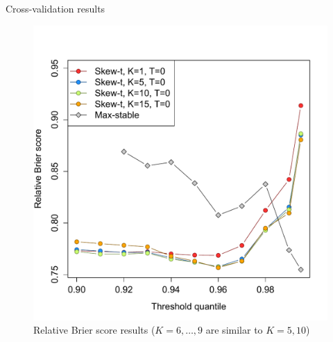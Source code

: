 \documentclass{beamer}
\begin{document}
\begin{frame}{Cross-validation results}
  \centering
  \begin{figure}
    \includegraphics[width=0.6\linewidth, trim=0 0 0 1in]{./plots/pot/bs-ozone-1.pdf}
    \caption{Relative Brier score results ($K = 6, \ldots, 9$ are similar to $K = 5, 10$)}
  \end{figure}
\end{frame}
\end{document}
